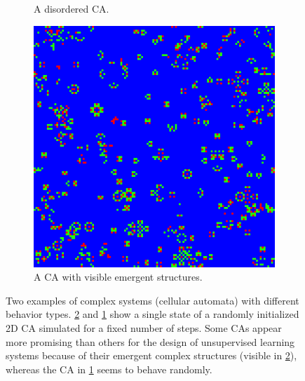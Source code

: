 \begin{enumerate}
\begin{figure}[htbp]
\begin{subfigure}[t]{.4\linewidth}
  \caption{A disordered \acl{CA}.}
 \label{fig:disordered_sys}
\end{subfigure}
\hspace{30pt}
\begin{subfigure}[t]{.4\linewidth}
  \centering
  \includegraphics[width=\linewidth]{figures/micro4.png}
  \caption{A \acl{CA} with visible emergent structures.}
  \label{fig:structured_sys}
\end{subfigure}
\caption{Two examples of complex systems (cellular automata) with different behavior
  types. \ref{fig:structured_sys} and \ref{fig:disordered_sys} show a single state 
  of a randomly initialized 2D \ac{CA} simulated for a fixed number of steps. Some \acp{CA} 
  appear more promising than others for the design of
  unsupervised learning systems because of their emergent complex structures
  (visible in \ref{fig:structured_sys}), whereas the \ac{CA} in
  \ref{fig:disordered_sys} seems to behave randomly.}
  \label{fig:comparison_ca}
\end{figure}


\end{enumerate}
